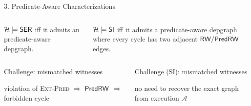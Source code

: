 \begin{frame}{3. Predicate-Aware Characterizations}
  \begin{columns}[T,onlytextwidth]
      \footnotesize
      \begin{theorem}
        $\mathcal{H} \models \mathsf{SER}$ iff
        it admits an  predicate-aware depgraph.
      \end{theorem}
      \footnotesize
      \begin{theorem}
        $\mathcal{H} \models \mathsf{SI}$ iff it admits a predicate-aware depgraph
        where every cycle has two adjacent $\mathsf{RW}/\mathsf{PredRW}$ edges.
      \end{theorem}
  \end{columns}

  \pause
  \vspace{.5em}
  \begin{center}
    \footnotesize{}
  \end{center}
  \vspace{-.5em}

  \begin{columns}[T,onlytextwidth]
      \begin{alertblock}{Challenge: mismatched witnesses}
        \begin{center}
        \end{center}
        \vspace{-.5em}
        \scriptsize
        violation of \textsc{Ext-Pred} $\Rightarrow$
        $\mathsf{PredRW}$ $\Rightarrow$ forbidden cycle
      \end{alertblock}
      \begin{alertblock}{Challenge (\textsc{SI}): mismatched witnesses}
        \begin{center}
        \end{center}
        \vspace{-.5em}
        \scriptsize
        no need to recover the exact graph from execution $\mathcal{A}$
      \end{alertblock}
  \end{columns}
\end{frame}

